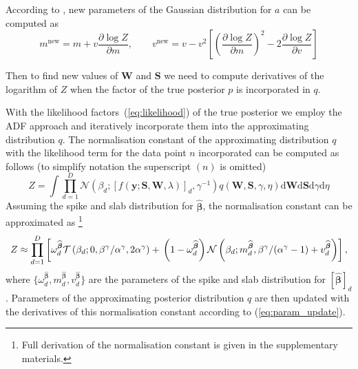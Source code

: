 \documentclass{article}
\begin{document}
  According to \cite{minka2001thesis}, new parameters of the Gaussian distribution for $a$ can be computed as
  \begin{equation}
  \label{eq:param_update}
  m^{\text{new}} = m + v \frac{\partial \log Z}{\partial m}, \qquad
  v^{\text{new}} = v - v^2\left[ \left(\frac{\partial \log Z}{\partial m}\right)^2 - 2 \frac{\partial \log Z}{\partial v}\right]
  \end{equation}
  
  Then to find new values of $\mathbf{W}$ and $\mathbf{S}$ we need to compute derivatives of the logarithm of $Z$ when the factor of the true posterior $p$ is incorporated in $q$.
  
  With the likelihood factors~(\ref{eq:likelihood}) of the true posterior we employ the ADF approach and iteratively incorporate them into the approximating distribution $q$. The normalisation constant of the approximating distribution $q$ with the likelihood term for the data point $n$ incorporated can be computed as follows (to simplify notation the superscript $(n)$ is omitted)
  \begin{equation}
  Z  = \int \prod_{d=1}^{D} \mathcal{N}(\beta_d ; [f(\mathbf{y} ; \mathbf{S}, \mathbf{W}, \lambda)]_d, \gamma^{-1}) q(\mathbf{W}, \mathbf{S}, \gamma, \eta) \mathrm{d}\mathbf{W} \mathrm{d}\mathbf{S} \mathrm{d}\gamma \mathrm{d}\eta
  \end{equation}
  Assuming the spike and slab distribution for $\widehat{\boldsymbol\beta}$, the normalisation constant can be approximated as \footnote{Full derivation of the normalisation constant is given in the supplementary materials.}
  \begin{equation}
  \label{eq:Z}
  Z \approx \prod_{d=1}^D \left[\omega^{\widehat{\boldsymbol\beta}}_d  \mathcal{T}\left(\beta_d ; 0, \beta^\gamma / \alpha^\gamma, 2\alpha^\gamma\right) + \vphantom{m^{\widehat{\boldsymbol\beta}}_d} \left(1 - \omega^{\widehat{\boldsymbol\beta}}_d\right)\mathcal{N}\left(\beta_d ; m^{\widehat{\boldsymbol\beta}}_d,  \beta^\gamma / (\alpha^\gamma - 1) + v^{\widehat{\boldsymbol\beta}}_d\right)\right],
  \end{equation}
  where $\{\omega^{\widehat{\boldsymbol\beta}}_d, m^{\widehat{\boldsymbol\beta}}_d, v^{\widehat{\boldsymbol\beta}}_d\}$ are the parameters of the spike and slab distribution for $[\widehat{\boldsymbol\beta}]_d$. Parameters of the approximating posterior distribution $q$ are then updated with the derivatives of this normalisation constant according to (\ref{eq:param_update}).
  
\end{document}
